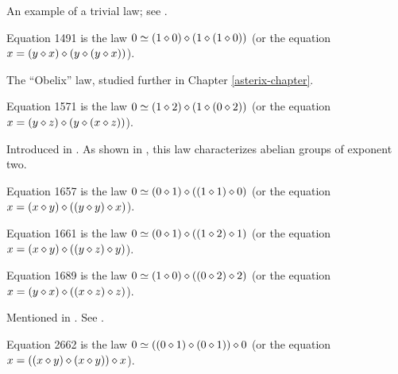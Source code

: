 An example of a trivial law; see .

\begin{definition}[Equation 1491]\label{eq1491}\leanok{}  Equation 1491 is the law $0 \simeq  (1 \diamond 0) \diamond (1 \diamond (1 \diamond 0))$ (or the equation $x = (y \diamond x) \diamond (y \diamond (y \diamond x))$).
\end{definition}

The ``Obelix'' law, studied further in Chapter \ref{asterix-chapter}.

\begin{definition}[Equation 1571]\label{eq1571}\leanok{}  Equation 1571 is the law $0 \simeq  (1 \diamond 2) \diamond (1 \diamond (0 \diamond 2))$ (or the equation $x = (y \diamond z) \diamond (y \diamond (x \diamond z))$).
\end{definition}

Introduced in \cite{mendelsohn-padmanabhan}.  As shown in , this law characterizes abelian groups of exponent two.

\begin{definition}[Equation 1657]\label{eq1657}\leanok{}  Equation 1657 is the law $0 \simeq  (0 \diamond 1) \diamond ((1 \diamond 1) \diamond 0)$ (or the equation $x = (x \diamond y) \diamond ((y \diamond y) \diamond x)$).
\end{definition}

\begin{definition}[Equation 1661]\label{eq1661}\leanok{}  Equation 1661 is the law $0 \simeq  (0 \diamond 1) \diamond ((1 \diamond 2) \diamond 1)$ (or the equation $x = (x \diamond y) \diamond ((y \diamond z) \diamond y)$).
\end{definition}


\begin{definition}[Equation 1689]\label{eq1689}\leanok{}  Equation 1689 is the law $0 \simeq  (1 \diamond 0) \diamond ((0 \diamond 2) \diamond 2)$ (or the equation $x = (y \diamond x) \diamond ((x \diamond z) \diamond z)$).
\end{definition}

Mentioned in \cite{Kisielewicz2}.  See .


\begin{definition}[Equation 2662]\label{eq2662}\leanok{}  Equation 2662 is the law $0 \simeq  ((0 \diamond 1) \diamond (0 \diamond 1)) \diamond 0$ (or the equation $x = ((x \diamond y) \diamond (x \diamond y)) \diamond x$).
\end{definition}

